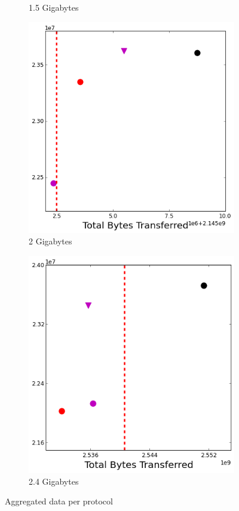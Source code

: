 \documentclass{sig-alternate-05-2015}
\begin{document}
\begin{figure}[t]
\begin{subfigure}{.24\linewidth}
	\caption{1.5 Gigabytes}
	\label{speed_bytes_1_5G}
	\end{subfigure}
	\begin{subfigure}{.24\linewidth}
	\includegraphics[width=\linewidth]{img/speed_bytes/2G.png}
	\caption{2 Gigabytes}
	\label{speed_bytes_2G}
	\end{subfigure}
	\begin{subfigure}{.24\linewidth}
	\includegraphics[width=\linewidth]{img/speed_bytes/2_4G.png}
	\caption{2.4 Gigabytes}
	\label{speed_bytes_2_4G}
	\end{subfigure}
\caption{Aggregated data per protocol}
\label{fig:aggregate}
\end{figure}
\end{document}
